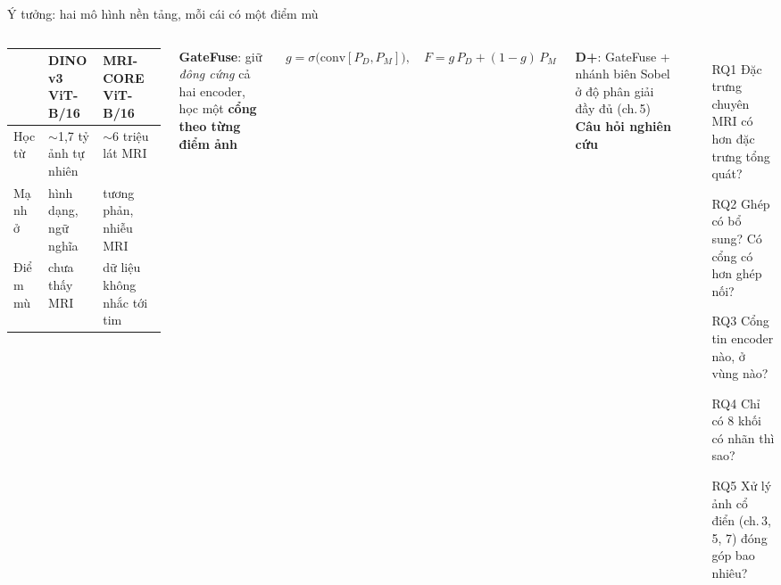 \documentclass[aspectratio=169,10pt]{beamer}
\newcommand{\hl}[1]{{\color{ptitred}\textbf{#1}}}
\begin{document}
\begin{frame}{Ý tưởng: hai mô hình nền tảng, mỗi cái có một điểm mù}
\begin{columns}[T]
\small
\renewcommand{\arraystretch}{1.3}
\begin{tabularx}{\linewidth}{@{}l>{\raggedright\arraybackslash}X>{\raggedright\arraybackslash}X@{}}
\toprule
 & \textbf{DINOv3 ViT-B/16} & \textbf{MRI-CORE ViT-B/16}\\
\midrule
Học từ & $\sim$1,7 tỷ ảnh tự nhiên & $\sim$6 triệu lát MRI\\
Mạnh ở & hình dạng, ngữ nghĩa & tương phản, nhiễu MRI\\
Điểm mù & chưa thấy MRI & dữ liệu không nhắc tới tim\\
\bottomrule
\end{tabularx}
\vspace{3mm}

\hl{GateFuse}: giữ \emph{đông cứng} cả hai encoder, học một \textbf{cổng theo từng điểm ảnh}\\[1mm]
\centerline{$g=\sigma\big(\mathrm{conv}[P_D,P_M]\big),\quad F=g\,P_D+(1-g)\,P_M$}\par\vspace{1mm}
\hl{D+}: GateFuse + nhánh biên Sobel ở độ phân giải đầy đủ (ch.\,5)
\small
\hl{Câu hỏi nghiên cứu}
\begin{itemize}
\item[RQ1] Đặc trưng chuyên MRI có hơn đặc trưng tổng quát?
\item[RQ2] Ghép có bổ sung? Có cổng có hơn ghép nối?
\item[RQ3] Cổng tin encoder nào, ở vùng nào?
\item[RQ4] Chỉ có 8 khối có nhãn thì sao?
\item[RQ5] Xử lý ảnh cổ điển (ch.\,3, 5, 7) đóng góp bao nhiêu?
\end{itemize}
\end{columns}
\end{frame}
\end{document}
